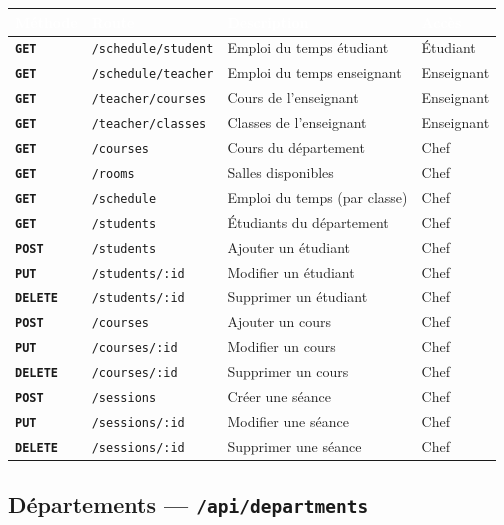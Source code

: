 \documentclass[12pt,a4paper]{article}
\newcommand{\route}[1]{\texorpdfstring{\texttt{\small\color{routeGray}#1}}{#1}}
\newcommand{\httpmethod}[1]{%
  \ifstrequal{#1}{GET}{\colorbox{blue!15}{\texttt{\bfseries\color{blue!70!black}GET}}}{}%
  \ifstrequal{#1}{POST}{\colorbox{green!18}{\texttt{\bfseries\color{green!60!black}POST}}}{}%
  \ifstrequal{#1}{PUT}{\colorbox{orange!18}{\texttt{\bfseries\color{orange!70!black}PUT}}}{}%
  \ifstrequal{#1}{DELETE}{\colorbox{red!15}{\texttt{\bfseries\color{red!70!black}DELETE}}}{}%
}
\begin{document}
\begin{center}
\small
\begin{tabular}{|l|l|p{6cm}|l|}
  \hline
  \rowcolor{headerBg}
  \textcolor{white}{\textbf{Méthode}} & \textcolor{white}{\textbf{Route}} & \textcolor{white}{\textbf{Description}} & \textcolor{white}{\textbf{Accès}} \\
  \hline
  \httpmethod{GET} & \texttt{/schedule/student} & Emploi du temps étudiant & Étudiant \\
  \httpmethod{GET} & \texttt{/schedule/teacher} & Emploi du temps enseignant & Enseignant \\
  \httpmethod{GET} & \texttt{/teacher/courses} & Cours de l'enseignant & Enseignant \\
  \httpmethod{GET} & \texttt{/teacher/classes} & Classes de l'enseignant & Enseignant \\
  \httpmethod{GET} & \texttt{/courses} & Cours du département & Chef \\
  \httpmethod{GET} & \texttt{/rooms} & Salles disponibles & Chef \\
  \httpmethod{GET} & \texttt{/schedule} & Emploi du temps (par classe) & Chef \\
  \httpmethod{GET} & \texttt{/students} & Étudiants du département & Chef \\
  \httpmethod{POST} & \texttt{/students} & Ajouter un étudiant & Chef \\
  \httpmethod{PUT} & \texttt{/students/:id} & Modifier un étudiant & Chef \\
  \httpmethod{DELETE} & \texttt{/students/:id} & Supprimer un étudiant & Chef \\
  \httpmethod{POST} & \texttt{/courses} & Ajouter un cours & Chef \\
  \httpmethod{PUT} & \texttt{/courses/:id} & Modifier un cours & Chef \\
  \httpmethod{DELETE} & \texttt{/courses/:id} & Supprimer un cours & Chef \\
  \httpmethod{POST} & \texttt{/sessions} & Créer une séance & Chef \\
  \httpmethod{PUT} & \texttt{/sessions/:id} & Modifier une séance & Chef \\
  \httpmethod{DELETE} & \texttt{/sessions/:id} & Supprimer une séance & Chef \\
  \hline
\end{tabular}
\end{center}

\subsection{Départements — \route{/api/departments}}
\end{document}
